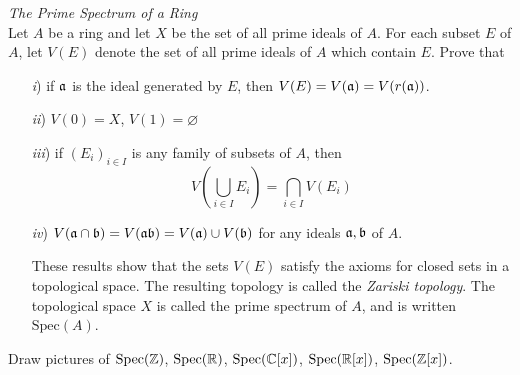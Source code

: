 \documentclass[10pt]{amsart}
\begin{document}
\begin{exercise}\emph{The Prime Spectrum of a Ring}\\
    Let $A$ be a ring and let $X$ be the set of all prime ideals of $A$. For each subset
    $E$ of $A$, let $V(E)$ denote the set of all prime ideals of $A$ which contain $E$. 
    Prove that 
    \begin{itemize}
        \item[\emph{i})] if $\mathfrak{a}$ is the ideal generated by $E$, then $V(E) = V(\mathfrak{a}) = V(r(\mathfrak{a}))$.
        \item[\emph{ii})] $V(0) = X$, $V(1) = \varnothing$
        \item[\emph{iii})] if $(E_i)_{i \in I}$ is any family of subsets of $A$, then
        \[
            V\left( \bigcup_{i \in I}E_i \right) = \bigcap_{i \in I}V(E_i)
        \] 
        \item[\emph{iv})] $V(\mathfrak{a} \cap \mathfrak{b}) = V(\mathfrak{a}\mathfrak{b}) = V(\mathfrak{a})\cup V(\mathfrak{b})$ 
        for any ideals $\mathfrak{a}, \mathfrak{b}$ of $A$.

        These results show that the sets $V(E)$ satisfy the axioms for closed sets in a topological space. 
        The resulting topology is called the \emph{Zariski topology}. The topological space 
        $X$ is called the prime spectrum of $A$, and is written $\text{Spec}(A)$.
    \end{itemize}
\end{exercise}

\begin{exercise}
    Draw pictures of $\operatorname{Spec}(\mathbb{Z})$, $\operatorname{Spec}(\mathbb{R})$, $\operatorname{Spec}(\mathbb{C}[x])$, $\operatorname{Spec}(\mathbb{R}[x])$, $\operatorname{Spec}(\mathbb{Z}[x])$.
\end{exercise}
\end{document}
